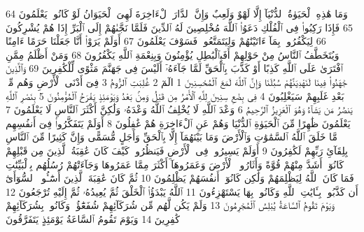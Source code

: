 {\tiny\colorbox{cl_aya}{64}} وَمَا هَٰذِهِ ٱلْحَيَوٰةُ ٱلدُّنْيَآ إِلَّا لَهْوٌ وَلَعِبٌ وَإِنَّ ٱلدَّارَ ٱلْءَاخِرَةَ لَهِىَ ٱلْحَيَوَانُ لَوْ كَانُوا۟ يَعْلَمُونَ
{\tiny\colorbox{cl_aya}{65}} فَإِذَا رَكِبُوا۟ فِى ٱلْفُلْكِ دَعَوُا۟ ٱللَّهَ مُخْلِصِينَ لَهُ ٱلدِّينَ فَلَمَّا نَجَّىٰهُمْ إِلَى ٱلْبَرِّ إِذَا هُمْ يُشْرِكُونَ
{\tiny\colorbox{cl_aya}{66}} لِيَكْفُرُوا۟ بِمَآ ءَاتَيْنَٰهُمْ وَلِيَتَمَتَّعُوا۟ فَسَوْفَ يَعْلَمُونَ
{\tiny\colorbox{cl_aya}{67}} أَوَلَمْ يَرَوْا۟ أَنَّا جَعَلْنَا حَرَمًا ءَامِنًا وَيُتَخَطَّفُ ٱلنَّاسُ مِنْ حَوْلِهِمْ أَفَبِٱلْبَٰطِلِ يُؤْمِنُونَ وَبِنِعْمَةِ ٱللَّهِ يَكْفُرُونَ
{\tiny\colorbox{cl_aya}{68}} وَمَنْ أَظْلَمُ مِمَّنِ ٱفْتَرَىٰ عَلَى ٱللَّهِ كَذِبًا أَوْ كَذَّبَ بِٱلْحَقِّ لَمَّا جَآءَهُۥٓ أَلَيْسَ فِى جَهَنَّمَ مَثْوًى لِّلْكَٰفِرِينَ
{\tiny\colorbox{cl_aya}{69}} وَٱلَّذِينَ جَٰهَدُوا۟ فِينَا لَنَهْدِيَنَّهُمْ سُبُلَنَا وَإِنَّ ٱللَّهَ لَمَعَ ٱلْمُحْسِنِينَ
{\tiny\colorbox{cl_aya}{1}} الٓمٓ
{\tiny\colorbox{cl_aya}{2}} غُلِبَتِ ٱلرُّومُ
{\tiny\colorbox{cl_aya}{3}} فِىٓ أَدْنَى ٱلْأَرْضِ وَهُم مِّنۢ بَعْدِ غَلَبِهِمْ سَيَغْلِبُونَ
{\tiny\colorbox{cl_aya}{4}} فِى بِضْعِ سِنِينَ لِلَّهِ ٱلْأَمْرُ مِن قَبْلُ وَمِنۢ بَعْدُ وَيَوْمَئِذٍ يَفْرَحُ ٱلْمُؤْمِنُونَ
{\tiny\colorbox{cl_aya}{5}} بِنَصْرِ ٱللَّهِ يَنصُرُ مَن يَشَآءُ وَهُوَ ٱلْعَزِيزُ ٱلرَّحِيمُ
{\tiny\colorbox{cl_aya}{6}} وَعْدَ ٱللَّهِ لَا يُخْلِفُ ٱللَّهُ وَعْدَهُۥ وَلَٰكِنَّ أَكْثَرَ ٱلنَّاسِ لَا يَعْلَمُونَ
{\tiny\colorbox{cl_aya}{7}} يَعْلَمُونَ ظَٰهِرًا مِّنَ ٱلْحَيَوٰةِ ٱلدُّنْيَا وَهُمْ عَنِ ٱلْءَاخِرَةِ هُمْ غَٰفِلُونَ
{\tiny\colorbox{cl_aya}{8}} أَوَلَمْ يَتَفَكَّرُوا۟ فِىٓ أَنفُسِهِم مَّا خَلَقَ ٱللَّهُ ٱلسَّمَٰوَٰتِ وَٱلْأَرْضَ وَمَا بَيْنَهُمَآ إِلَّا بِٱلْحَقِّ وَأَجَلٍ مُّسَمًّى وَإِنَّ كَثِيرًا مِّنَ ٱلنَّاسِ بِلِقَآئِ رَبِّهِمْ لَكَٰفِرُونَ
{\tiny\colorbox{cl_aya}{9}} أَوَلَمْ يَسِيرُوا۟ فِى ٱلْأَرْضِ فَيَنظُرُوا۟ كَيْفَ كَانَ عَٰقِبَةُ ٱلَّذِينَ مِن قَبْلِهِمْ كَانُوٓا۟ أَشَدَّ مِنْهُمْ قُوَّةً وَأَثَارُوا۟ ٱلْأَرْضَ وَعَمَرُوهَآ أَكْثَرَ مِمَّا عَمَرُوهَا وَجَآءَتْهُمْ رُسُلُهُم بِٱلْبَيِّنَٰتِ فَمَا كَانَ ٱللَّهُ لِيَظْلِمَهُمْ وَلَٰكِن كَانُوٓا۟ أَنفُسَهُمْ يَظْلِمُونَ
{\tiny\colorbox{cl_aya}{10}} ثُمَّ كَانَ عَٰقِبَةَ ٱلَّذِينَ أَسَٰٓـُٔوا۟ ٱلسُّوٓأَىٰٓ أَن كَذَّبُوا۟ بِـَٔايَٰتِ ٱللَّهِ وَكَانُوا۟ بِهَا يَسْتَهْزِءُونَ
{\tiny\colorbox{cl_aya}{11}} ٱللَّهُ يَبْدَؤُا۟ ٱلْخَلْقَ ثُمَّ يُعِيدُهُۥ ثُمَّ إِلَيْهِ تُرْجَعُونَ
{\tiny\colorbox{cl_aya}{12}} وَيَوْمَ تَقُومُ ٱلسَّاعَةُ يُبْلِسُ ٱلْمُجْرِمُونَ
{\tiny\colorbox{cl_aya}{13}} وَلَمْ يَكُن لَّهُم مِّن شُرَكَآئِهِمْ شُفَعَٰٓؤُا۟ وَكَانُوا۟ بِشُرَكَآئِهِمْ كَٰفِرِينَ
{\tiny\colorbox{cl_aya}{14}} وَيَوْمَ تَقُومُ ٱلسَّاعَةُ يَوْمَئِذٍ يَتَفَرَّقُونَ
